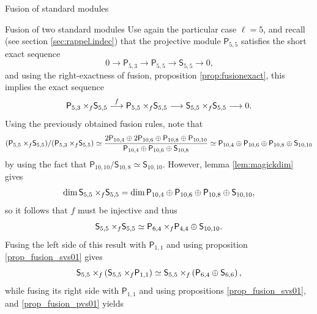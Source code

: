 \documentclass[reqno]{amsart}
\newtheorem{Prop}[Thm]{Proposition}
\newcommand{\dtl}[1]{\mathsf{dTL}_{#1}}
\newcommand{\ds}[1]{\mathsf S_{#1}}
\newcommand{\dP}[1]{\mathsf P_{#1}}
\newcommand{\xf}{\times\hspace{-0.27em}_f}
\newcommand{\lc}{\ell}
\DeclareMathOperator{\id}{id}
\begin{document}
\begin{section}{Fusion of standard modules}
\begin{subsection}{Fusion of two standard modules}
Use again the particular case $\lc=5$, and recall (see section \ref{sec:rappel.indec}) that the projective module $\dP{5,5}$ satisfies the short exact sequence $$ 0 \longrightarrow \dP{5,3} \longrightarrow \dP{5,5} \longrightarrow \ds{5,5} \longrightarrow 0 \text{,}$$ and using the right-exactness of fusion, proposition \ref{prop:fusionexact}, this implies the exact sequence
\begin{equation}
\dP{5,3}\xf \ds{5,5} \overset{f}{\longrightarrow} \dP{5,5}\xf \ds{5,5}  \longrightarrow \ds{5,5}\xf \ds{5,5}  \longrightarrow 0\text{.}
\end{equation}
Using the previously obtained fusion rules,  note that 
\begin{equation}
(\dP{5, 5}\xf \ds{5, 5})/(\dP{5, 3}\xf \ds{5, 5}) \simeq \frac{2 \dP{10,4} \oplus 2\dP{10,6} \oplus \dP{10,8} \oplus \dP{10,10}}{\dP{10,4} \oplus \dP{10,6} \oplus \ds{10,8}} \simeq \dP{10,4} \oplus \dP{10,6} \oplus \dP{10,8} \oplus \ds{10,10}
\end{equation}
by using the fact that $\dP{10,10}/\ds{10,8} \simeq \ds{10,10}$. %
However, lemma \ref{lem:magickdim} gives $$\dim{\ds{5,5}\xf\ds{5,5}} = \dim{\dP{10,4} \oplus \dP{10,6} \oplus \dP{10,8} \oplus \ds{10,10}},$$ so it follows that $f$ must be injective and thus %
$$\ds{5,5} \xf \ds{5,5} \simeq \dP{6,4}\xf \dP{4,4} \oplus \ds{10,10}. $$
Fusing the left side of this result with $\dP{1,1}$ and using proposition \ref{prop_fusion_svs01} gives
\begin{equation}\label{eq:exampleSvsS.1}
	\ds{5,5} \xf \left(\ds{5,5} \xf \dP{1,1} \right) \simeq \ds{5,5} \xf \left(\dP{6,4} \oplus \ds{6,6}\right),
\end{equation}
while fusing its right side with $\dP{1,1} $ and using propositions \ref{prop_fusion_svs01}, and \ref{prop_fusion_pvs01} yields
\begin{equation}\label{eq:exampleSvsS.2}

\end{equation}
\end{subsection}
\end{section}
\end{document}
